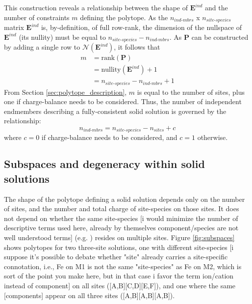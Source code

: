 \documentclass[preprint,12pt]{elsarticle}
\begin{document}
 This construction reveals a relationship between the shape of $\boldsymbol{E}^{\textit{ind}}$ and the number of constraints $m$ defining the polytope. As the $n_{\textit{ind-mbrs}}$ x $n_{\textit{site-species}}$ matrix $\boldsymbol{E}^{\textit{ind}}$ is, by-definition, of full row-rank, the dimension of the nullspace of $\boldsymbol{E}^{\textit{ind}}$ (its nullity) must be equal to $n_{\textit{site-species}} - n_{\textit{ind-mbrs}}$. As $\boldsymbol{P}$ can be constructed by adding a single row to $\mathcal{N}(\boldsymbol{E}^{\textit{ind}})$, it follows that
 \begin{equation}
 \begin{split}
     m &= \textrm{rank}(\boldsymbol{P}) \\
     &= \textrm{nullity}(\boldsymbol{E}^{\textit{ind}}) + 1 \\
     &= n_{\textit{site-species}} - n_{\textit{ind-mbrs}} + 1
\end{split}    
    \label{eqn:ind_mbrs}
 \end{equation}
From Section \ref{sec:polytope_description}, $m$ is equal to the number of sites, plus one if charge-balance needs to be considered. Thus, the number of independent endmembers describing a fully-consistent solid solution is governed by the relationship:
 \begin{equation}
     n_{\textit{ind-mbrs}} = n_{\textit{site-species}} - n_{\textit{sites}} + c
     \label{eqn:site_mbr_relationship}
 \end{equation}
where $c=0$ if charge-balance needs to be considered, and $c=1$ otherwise. 

\subsection{Subspaces and degeneracy within solid solutions}

The shape of the polytope defining a solid solution depends only on the number of sites, and the number and total charge of site-species on those sites. It does not depend on whether the same site-species [i would minimize the number of descriptive terms used here, already by themselves component/species are not well understood terms] (e.g. ) resides on multiple sites. Figure \ref{fig:subspaces} shows polytopes for two three-site solutions, one with different site-species [i suppose it's possible to debate whether "site" already carries a site-specific connotation, i.e., Fe on M1 is not the same "site-species" as Fe on M2, which is sort of the point you make here, but in that case i favor the term ion/cation instead of component]   on all sites ([A,B][C,D][E,F]), and one where the same [components] appear on all three sites ([A,B][A,B][A,B]).
\end{document}
